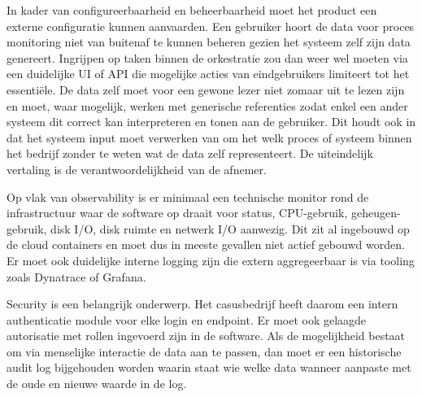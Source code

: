 In kader van configureerbaarheid en beheerbaarheid moet het product een externe configuratie kunnen aanvaarden. Een gebruiker hoort de data voor proces monitoring niet van buitenaf te kunnen beheren gezien het systeem zelf zijn data genereert. Ingrijpen op taken binnen de orkestratie zou dan weer wel moeten via een duidelijke UI of API die mogelijke acties van eindgebruikers limiteert tot het essentiële. De data zelf moet voor een gewone lezer niet zomaar uit te lezen zijn en moet, waar mogelijk, werken met generische referenties zodat enkel een ander systeem dit correct kan interpreteren en tonen aan de gebruiker. Dit houdt ook in dat het systeem input moet verwerken van om het welk proces of systeem binnen het bedrijf zonder te weten wat de data zelf representeert. De uiteindelijk vertaling is de verantwoordelijkheid van de afnemer. \newline

Op vlak van observability is er minimaal een technische monitor rond de infrastructuur waar de software op draait voor status, CPU-gebruik, geheugen-gebruik, disk I/O, disk ruimte en netwerk I/O aanwezig. Dit zit al ingebouwd op de cloud containers en moet dus in meeste gevallen niet actief gebouwd worden. Er moet ook duidelijke interne logging zijn die extern aggregeerbaar is via tooling zoals Dynatrace of Grafana. \newline

Security is een belangrijk onderwerp. Het casusbedrijf heeft daarom een intern authenticatie module voor elke login en endpoint. Er moet ook gelaagde autorisatie met rollen ingevoerd zijn in de software. Als de mogelijkheid bestaat om via menselijke interactie de data aan te passen, dan moet er een historische audit log bijgehouden worden waarin staat wie welke data wanneer aanpaste met de oude en nieuwe waarde in de log. 